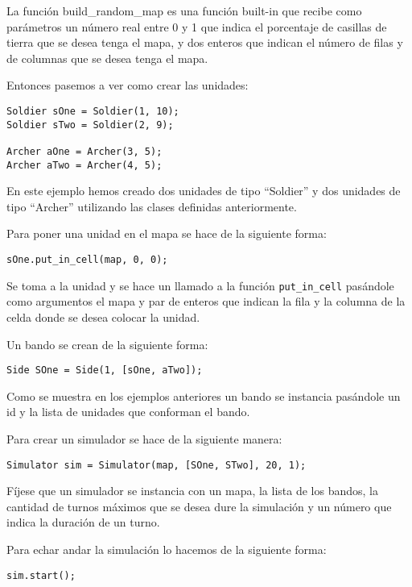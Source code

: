 La funci\'on build\_random\_map es una funci\'on built-in que recibe como par\'ametros un n\'umero real entre 0 y 1 que indica el porcentaje de casillas de tierra que se desea tenga el mapa, y dos enteros que indican el n\'umero de filas y de columnas que se desea tenga el mapa.

Entonces pasemos a ver como crear las unidades:

\begin{verbatim}
Soldier sOne = Soldier(1, 10);
Soldier sTwo = Soldier(2, 9);
	
Archer aOne = Archer(3, 5);
Archer aTwo = Archer(4, 5);	
\end{verbatim}  

En este ejemplo hemos creado dos unidades de tipo ``Soldier'' y dos unidades de tipo ``Archer'' utilizando las clases definidas anteriormente.

Para poner una unidad en el mapa se hace de la siguiente forma:

\begin{verbatim}
sOne.put_in_cell(map, 0, 0);
\end{verbatim}

Se toma a la unidad y se hace un llamado a la funci\'on \verb|put_in_cell| pas\'andole como argumentos el mapa y par de enteros que indican la fila y la columna de la celda donde se desea colocar la unidad.

Un bando se crean de la siguiente forma:
  
\begin{verbatim}
Side SOne = Side(1, [sOne, aTwo]);
\end{verbatim}

Como se muestra en los ejemplos anteriores un bando se instancia pas\'andole un id y la lista de unidades que conforman el bando.

Para crear un simulador se hace de la siguiente manera:

\begin{verbatim}
Simulator sim = Simulator(map, [SOne, STwo], 20, 1);
\end{verbatim}

F\'ijese que un simulador se instancia con un mapa, la lista de los bandos, la cantidad de turnos m\'aximos que se desea dure la simulaci\'on y un n\'umero que indica la duraci\'on de un turno.

Para echar andar la simulaci\'on lo hacemos de la siguiente forma: 

\begin{verbatim}
sim.start();
\end{verbatim}


